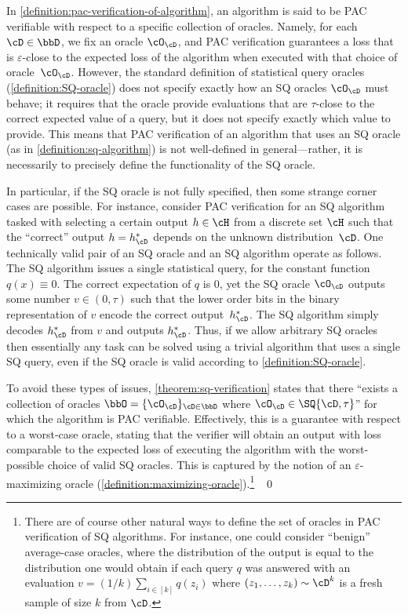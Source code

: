 \documentclass{toc}
\begin{document}
\begin{remark}
	In \cref{definition:pac-verification-of-algorithm}, an algorithm is said to be PAC verifiable with respect to a specific collection of oracles. Namely, for each $\cD \in \bbD$, we fix an oracle $\cO_\cD$, and PAC verification guarantees a loss that is $\varepsilon$-close to the expected loss of the algorithm when executed with that choice of oracle~$\cO_\cD$. However, the standard definition of statistical query oracles (\cref{definition:SQ-oracle}) does not specify exactly how an SQ oracles $\cO_\cD$ must behave; it requires that the oracle provide evaluations  that are $\tau$-close to the correct expected value of a query, but it does not specify exactly which value to provide. This means that PAC verification of an algorithm that uses an SQ oracle (as in \cref{definition:sq-algorithm}) is not well-defined in general---rather, it is necessarily to precisely define the functionality of the SQ oracle. 

	In particular, if the SQ oracle is not fully specified, then some strange corner cases are possible. For instance, consider PAC verification for an SQ algorithm tasked with selecting a certain output $h \in \cH$ from a discrete set $\cH$ such that the ``correct'' output $h=h^*_\cD$ depends on the unknown distribution~$\cD$. One technically valid pair of an SQ oracle and an SQ algorithm operate as follows. The SQ algorithm issues a single statistical query, for the constant function $q(x) \equiv 0$. The correct expectation of $q$ is $0$, yet the SQ oracle $\cO_\cD$ outputs some number $v \in (0,\tau)$ such that the lower order bits in the binary representation of $v$ encode the correct output~$h^*_\cD$. The SQ algorithm simply decodes $h^*_\cD$ from $v$ and outputs $h^*_\cD$. Thus, if we allow arbitrary SQ oracles then essentially any task can be solved using a trivial algorithm that uses a single SQ query, even if the SQ oracle is valid according to \cref{definition:SQ-oracle}.

	To avoid these types of issues, \cref{theorem:sq-verification} states that there ``exists a collection of oracles $\bbO = \{\cO_\cD\}_{\cD \in \bbD}$ where $\cO_\cD \in \SQ{\cD,\tau}$'' for which the algorithm is PAC verifiable. Effectively, this is a guarantee with respect to a worst-case oracle, stating that the verifier will obtain an output with loss comparable to the expected loss of executing the algorithm with the worst-possible choice of valid SQ oracles. This is captured by the notion of an $\varepsilon$-maximizing oracle (\cref{definition:maximizing-oracle}).\footnote{
		There are of course other natural ways to define the set of oracles in PAC verification of SQ algorithms. For instance, one could consider ``benign'' average-case oracles, where the distribution of the output is equal to the distribution one would obtain if each query $q$ was answered with an evaluation $v = (1/k)\sum_{i \in [k]}q(z_i)$ where $(z_1,\dots,z_k)\sim \cD^k$ is a fresh sample of size $k$ from $\cD$.
	}
	~\qed
\end{remark}
\end{document}
